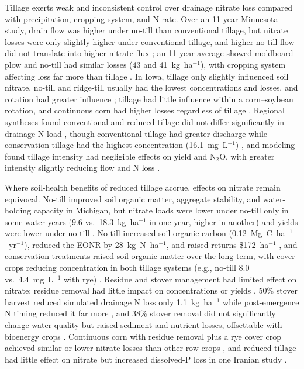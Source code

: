 Tillage exerts weak and inconsistent control over drainage nitrate loss compared with precipitation, cropping system, and N rate. Over an 11-year Minnesota study, drain flow was higher under no-till than conventional tillage, but nitrate losses were only slightly higher under conventional tillage, and higher no-till flow did not translate into higher nitrate flux \parencite{RANDALL1995}; an 11-year average showed moldboard plow and no-till had similar losses (43 and 41~kg~ha$^{-1}$), with cropping system affecting loss far more than tillage \parencite{Randall2001}. In Iowa, tillage only slightly influenced soil nitrate, no-till and ridge-till usually had the lowest concentrations and losses, and rotation had greater influence \parencite{Weed1996}; tillage had little influence within a corn--soybean rotation, and continuous corn had higher losses regardless of tillage \parencite{Kanwar1997}. Regional syntheses found conventional and reduced tillage did not differ significantly in drainage N load \parencite{Zhao2016}, though conventional tillage had greater discharge while conservation tillage had the highest concentration (16.1~mg~L$^{-1}$) \parencite{Hertzberger2019}, and modeling found tillage intensity had negligible effects on yield and N$_2$O, with greater intensity slightly reducing flow and N loss \parencite{Wang2016b}.

Where soil-health benefits of reduced tillage accrue, effects on nitrate remain equivocal. No-till improved soil organic matter, aggregate stability, and water-holding capacity in Michigan, but nitrate loads were lower under no-till only in some water years (9.6 vs.\ 18.3~kg~ha$^{-1}$ in one year, higher in another) and yields were lower under no-till \parencite{Masri2024}. No-till increased soil organic carbon (0.12~Mg~C~ha$^{-1}$~yr$^{-1}$), reduced the EONR by 28~kg~N~ha$^{-1}$, and raised returns \$172~ha$^{-1}$ \parencite{Cassman2025}, and conservation treatments raised soil organic matter over the long term, with cover crops reducing concentration in both tillage systems (e.g., no-till 8.0 vs.\ 4.4~mg~L$^{-1}$ with rye) \parencite{Waring2024}. Residue and stover management had limited effect on nitrate: residue removal had little impact on concentrations or yields \parencite{Dougherty2020}, 50\% stover harvest reduced simulated drainage N loss only 1.1~kg~ha$^{-1}$ while post-emergence N timing reduced it far more \parencite{Malone2019}, and 38\% stover removal did not significantly change water quality but raised sediment and nutrient losses, offsettable with bioenergy crops \parencite{Guo2018}. Continuous corn with residue removal plus a rye cover crop achieved similar or lower nitrate losses than other row crops \parencite{Daigh2015b}, and reduced tillage had little effect on nitrate but increased dissolved-P loss in one Iranian study \parencite{Farahani2020}.

